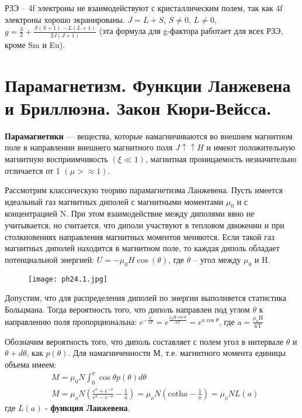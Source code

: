 РЗЭ --  4f электроны не взаимодействуют с кристаллическим полем, так как 4f электроны хорошо экранированы. $J=L+S$, $S\neq0$, $L\neq0$, 
$g=\frac{3}{2}+\frac{S(S+1)-L(L+1)}{2J(J+1)}$   (эта формула для g-фактора работает для всех РЗЭ, кроме Sm и Eu).


\section{Парамагнетизм. Функции Ланжевена и Бриллюэна. Закон Кюри-Вейсса.}

\textbf{Парамагнетики} --- вещества, которые намагничиваются во внешнем магнитном поле в направлении внешнего магнитного поля $ J \uparrow \uparrow H $ и имеют положительную магнитную восприимчивость $(\xi \ll 1)$, магнитная проницаемость незначительно отличается от 1  $ (\mu > \approx 1) $.


Рассмотрим классическую теорию парамагнетизма Ланжевена. Пусть имеется идеальный газ магнитных диполей с магнитными моментами $ \mu_0 $ и с концентрацией N. При этом взаимодействие между диполями явно не учитывается, но считается, что диполи участвуют в тепловом движении и при столкновениях направления магнитных моментов меняются. Если такой газ магнитных диполей находится в магнитном поле, то каждая диполь обладает потенциальной энергией: $U = - \mu_0 H \cos{(\theta)} $, где  $\theta$ -- угол между $ \mu_0 $ и H. 
\begin{figure}[h!]
    \centering
    \texttt{[image: ph24.1.jpg]}
\end{figure}


Допустим, что для распределения диполей по энергии выполняется статистика Больцмана. Тогда вероятность того, что диполь направлен под углом $\theta$ к направлению поля пропорциональна: 
$e^{-\frac{U}{k T}}=e^{\frac{\mu_0 \mathrm{H} \cos \theta}{k T}}=e^{a \cos \theta}$, где $\mathrm{a}=\frac{\mu_0 \mathrm{H}} {\mathrm{kT}}$

Обозначим вероятность того, что диполь составляет с полем угол в интервале $\theta$ и $\theta + d \theta$, как $p(\theta)$. Для намагниченности М, т.е. магнитного момента единицы объема имеем: 
$$ \begin{aligned}
& M = \mu_0 N \int_0^\pi \cos{\theta p(\theta) d \theta} \\
& M=\mu_o N\left(\frac{e^a+e^{-a}}{e^a-e^{-a}}-\frac{1}{a}\right)=\mu_o N\left(\mathrm{coth} a-\frac{1}{a}\right)=\mu_o N L(a)
\end{aligned}
$$
\noindent где $L(a)$ - \textbf{функция Ланжевена}. 


